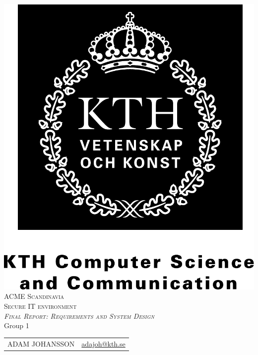 \documentclass[a4paper,12pt,oneside]{article}
\begin{document}


\begin{titlepage}
    \begin{center}
        \includegraphics[scale=0.2]{figures/kth_svv_comp_science_comm.pdf}\\
        \vspace{2cm}
        \textsc{\LARGE ACME Scandinavia}\\
        \vspace{0.5cm}
        \textsc{\large Secure IT environment}\\
        \vspace{1cm}
        \textsc{\large\textit{Final Report: Requirements and System Design}}\\
        \vspace{5.5cm}
        Group 1\\
        \vspace{0.5cm}
        \begin{tabular}{ l  r }
            ADAM JOHANSSON          &   \small{\href{mailto:adajoh@kth.se}{adajoh@kth.se}}      \\

\end{tabular}
\end{center}
\end{titlepage}
\end{document}

